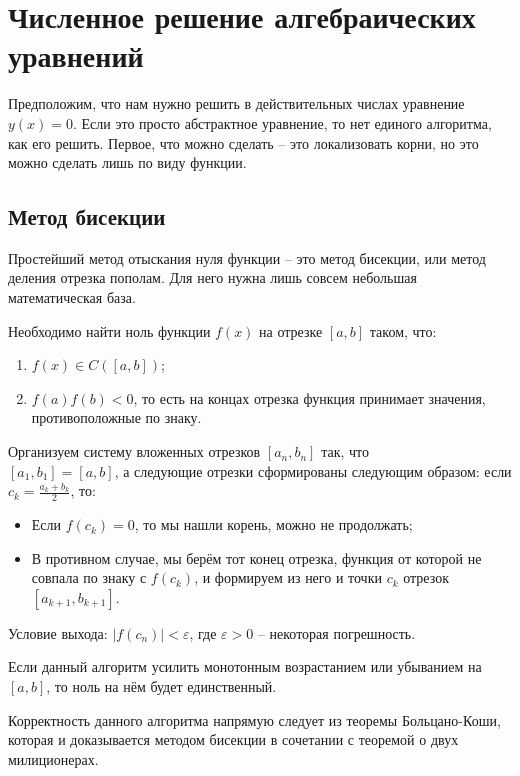 \documentclass[main.tex]{subfile}
\begin{document}
\section{Численное решение алгебраических уравнений}

Предположим, что нам нужно решить в действительных числах уравнение
$y(x)=0$. Если это просто абстрактное уравнение, то нет единого
алгоритма, как его решить. Первое, что можно сделать -- это локализовать
корни, но это можно сделать лишь по виду функции.

\subsection{Метод бисекции}

Простейший метод отыскания нуля функции -- это метод бисекции, или метод
деления отрезка пополам. Для него нужна лишь совсем небольшая математическая
база.

\begin{algorithm}
	Необходимо найти ноль функции $f(x)$ на отрезке $[a,b]$ таком, что:
	\begin{enumerate}
		\item $f(x)\in C([a,b])$;
		\item $f(a)f(b)<0$, то есть на концах отрезка функция
			принимает значения, противоположные по знаку.
	\end{enumerate}

	Организуем систему вложенных отрезков $[a_n, b_n]$ так, что\\
	$[a_1, b_1]=[a,b]$, а следующие отрезки сформированы следующим образом:
	если $c_k=\frac{a_k+b_k}{2}$, то:
	\begin{itemize}
		\item Если $f(c_k)=0$, то мы нашли корень, можно не продолжать;
		\item В противном случае, мы берём тот конец отрезка, функция от
			которой не совпала по знаку с $f(c_k)$, и формируем из него
			и точки $c_k$ отрезок $[a_{k+1},b_{k+1}]$.
	\end{itemize}

	Условие выхода: $|f(c_n)|<\varepsilon$, где $\varepsilon>0$ -- некоторая
	погрешность.

	Если данный алгоритм усилить монотонным возрастанием или убыванием на $[a,b]$,
	то ноль на нём будет единственный.
\end{algorithm}

Корректность данного алгоритма напрямую следует из теоремы Больцано-Коши, которая
и доказывается методом бисекции в сочетании с теоремой о двух милиционерах.
\end{document}
